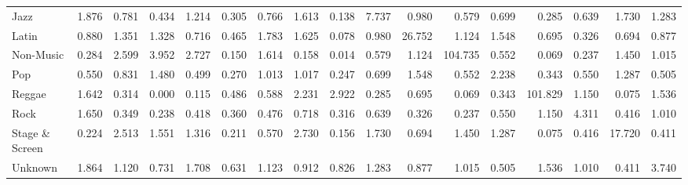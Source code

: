 \begin{table}
\begin{tabular}{lrrrrrrrrrrrrrrrr}
                  Jazz &  1.876 &             0.781 &       0.434 &      1.214 &       0.305 &                   0.766 &        1.613 &    0.138 & 7.737 &  0.980 &      0.579 & 0.699 &   0.285 & 0.639 &           1.730 &    1.283 \\
                 Latin &  0.880 &             1.351 &       1.328 &      0.716 &       0.465 &                   1.783 &        1.625 &    0.078 & 0.980 & 26.752 &      1.124 & 1.548 &   0.695 & 0.326 &           0.694 &    0.877 \\
             Non-Music &  0.284 &             2.599 &       3.952 &      2.727 &       0.150 &                   1.614 &        0.158 &    0.014 & 0.579 &  1.124 &    104.735 & 0.552 &   0.069 & 0.237 &           1.450 &    1.015 \\
                   Pop &  0.550 &             0.831 &       1.480 &      0.499 &       0.270 &                   1.013 &        1.017 &    0.247 & 0.699 &  1.548 &      0.552 & 2.238 &   0.343 & 0.550 &           1.287 &    0.505 \\
                Reggae &  1.642 &             0.314 &       0.000 &      0.115 &       0.486 &                   0.588 &        2.231 &    2.922 & 0.285 &  0.695 &      0.069 & 0.343 & 101.829 & 1.150 &           0.075 &    1.536 \\
                  Rock &  1.650 &             0.349 &       0.238 &      0.418 &       0.360 &                   0.476 &        0.718 &    0.316 & 0.639 &  0.326 &      0.237 & 0.550 &   1.150 & 4.311 &           0.416 &    1.010 \\
        Stage \& Screen &  0.224 &             2.513 &       1.551 &      1.316 &       0.211 &                   0.570 &        2.730 &    0.156 & 1.730 &  0.694 &      1.450 & 1.287 &   0.075 & 0.416 &          17.720 &    0.411 \\
               Unknown &  1.864 &             1.120 &       0.731 &      1.708 &       0.631 &                   1.123 &        0.912 &    0.826 & 1.283 &  0.877 &      1.015 & 0.505 &   1.536 & 1.010 &           0.411 &    3.740 \\
\bottomrule
\end{tabular}
\end{table}

